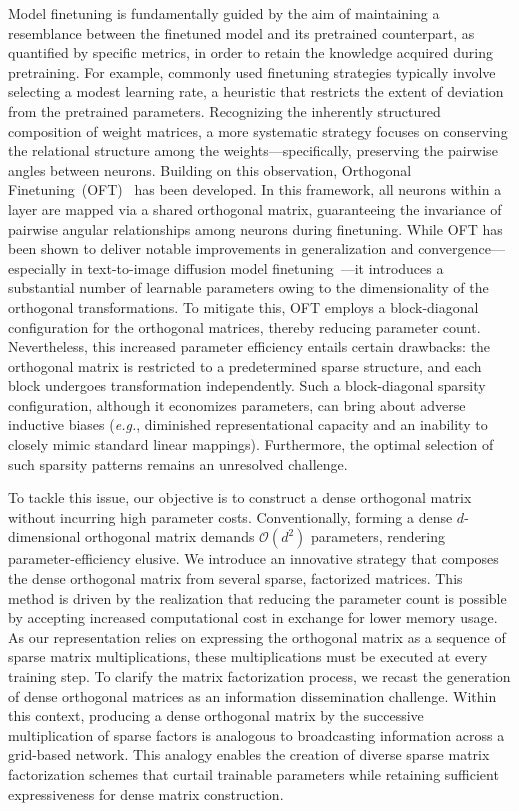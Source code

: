 Model finetuning is fundamentally guided by the aim of maintaining a resemblance between the finetuned model and its pretrained counterpart, as quantified by specific metrics, in order to retain the knowledge acquired during pretraining. For example, commonly used finetuning strategies typically involve selecting a modest learning rate, a heuristic that restricts the extent of deviation from the pretrained parameters. Recognizing the inherently structured composition of weight matrices, a more systematic strategy focuses on conserving the relational structure among the weights—specifically, preserving the pairwise angles between neurons. Building on this observation, Orthogonal Finetuning~(OFT)~\cite{qiu2023controlling} has been developed. In this framework, all neurons within a layer are mapped via a shared orthogonal matrix, guaranteeing the invariance of pairwise angular relationships among neurons during finetuning. While OFT has been shown to deliver notable improvements in generalization and convergence—especially in text-to-image diffusion model finetuning~\cite{qiu2023controlling}—it introduces a substantial number of learnable parameters owing to the dimensionality of the orthogonal transformations. To mitigate this, OFT employs a block-diagonal configuration for the orthogonal matrices, thereby reducing parameter count. Nevertheless, this increased parameter efficiency entails certain drawbacks: the orthogonal matrix is restricted to a predetermined sparse structure, and each block undergoes transformation independently. Such a block-diagonal sparsity configuration, although it economizes parameters, can bring about adverse inductive biases (\emph{e.g.}, diminished representational capacity and an inability to closely mimic standard linear mappings). Furthermore, the optimal selection of such sparsity patterns remains an unresolved challenge.

To tackle this issue, our objective is to construct a dense orthogonal matrix without incurring high parameter costs. Conventionally, forming a dense $d$-dimensional orthogonal matrix demands $\mathcal{O}(d^2)$ parameters, rendering parameter-efficiency elusive. We introduce an innovative strategy that composes the dense orthogonal matrix from several sparse, factorized matrices. This method is driven by the realization that reducing the parameter count is possible by accepting increased computational cost in exchange for lower memory usage. As our representation relies on expressing the orthogonal matrix as a sequence of sparse matrix multiplications, these multiplications must be executed at every training step. To clarify the matrix factorization process, we recast the generation of dense orthogonal matrices as an information dissemination challenge. Within this context, producing a dense orthogonal matrix by the successive multiplication of sparse factors is analogous to broadcasting information across a grid-based network. This analogy enables the creation of diverse sparse matrix factorization schemes that curtail trainable parameters while retaining sufficient expressiveness for dense matrix construction.

